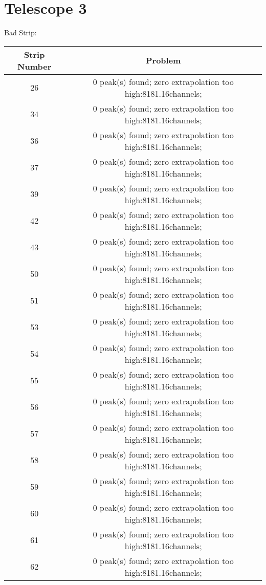 \documentclass[a4paper,6pt]{article}
\begin{document}
\section{Telescope 3 }
 Bad Strip:
\begin{center}
\begin{tabular}{ | c | c | } 
\hline 
 Strip Number & Problem \\ \hline 
26 &  0 peak(s) found; zero extrapolation too high:8181.16channels;  \\ \hline 
34 &  0 peak(s) found; zero extrapolation too high:8181.16channels;  \\ \hline 
36 &  0 peak(s) found; zero extrapolation too high:8181.16channels;  \\ \hline 
37 &  0 peak(s) found; zero extrapolation too high:8181.16channels;  \\ \hline 
39 &  0 peak(s) found; zero extrapolation too high:8181.16channels;  \\ \hline 
42 &  0 peak(s) found; zero extrapolation too high:8181.16channels;  \\ \hline 
43 &  0 peak(s) found; zero extrapolation too high:8181.16channels;  \\ \hline 
50 &  0 peak(s) found; zero extrapolation too high:8181.16channels;  \\ \hline 
51 &  0 peak(s) found; zero extrapolation too high:8181.16channels;  \\ \hline 
53 &  0 peak(s) found; zero extrapolation too high:8181.16channels;  \\ \hline 
54 &  0 peak(s) found; zero extrapolation too high:8181.16channels;  \\ \hline 
55 &  0 peak(s) found; zero extrapolation too high:8181.16channels;  \\ \hline 
56 &  0 peak(s) found; zero extrapolation too high:8181.16channels;  \\ \hline 
57 &  0 peak(s) found; zero extrapolation too high:8181.16channels;  \\ \hline 
58 &  0 peak(s) found; zero extrapolation too high:8181.16channels;  \\ \hline 
59 &  0 peak(s) found; zero extrapolation too high:8181.16channels;  \\ \hline 
60 &  0 peak(s) found; zero extrapolation too high:8181.16channels;  \\ \hline 
61 &  0 peak(s) found; zero extrapolation too high:8181.16channels;  \\ \hline 
62 &  0 peak(s) found; zero extrapolation too high:8181.16channels;  \\ \hline 

\end{tabular}
\end{center}
\end{document}
